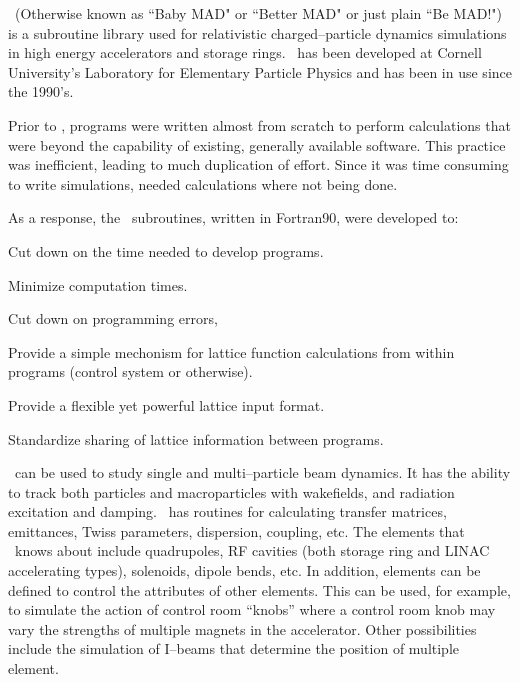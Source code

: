 
\bmad\ (Otherwise known as ``Baby MAD" or ``Better MAD" or just plain
``Be MAD!")  is a subroutine library used for relativistic
charged--particle dynamics simulations in high energy accelerators and
storage rings. \bmad\ has been developed at Cornell University's
Laboratory for Elementary Particle Physics and has been in use since
the 1990's. 

Prior to \bmad, programs were written almost from scratch to perform
calculations that were beyond the capability of existing, generally
available software. This practice was inefficient, leading to much
duplication of effort.  Since it was time consuming to write
simulations, needed calculations where not being done.

As a response, the \bmad\ subroutines, written in
Fortran90, were developed to:
\begin{Itemize}
\item Cut down on the time needed to develop programs.
\item Minimize computation times.
\item Cut down on programming errors, 
\item Provide a simple mechonism for lattice function calculations
from within programs (control system or otherwise).
\item Provide a flexible yet powerful lattice input format.
\item Standardize sharing of lattice information between 
programs.
\end{Itemize}

\bmad\ can be used to study single and multi--particle beam dynamics.
It has the ability to track both particles and macroparticles with
wakefields, and radiation excitation and damping. \bmad\ has routines
for calculating transfer matrices, emittances, Twiss parameters,
dispersion, coupling, etc. The elements that \bmad\ knows about
include quadrupoles, RF cavities (both storage ring and LINAC
accelerating types), solenoids, dipole bends, etc. In addition,
elements can be defined to control the attributes of other
elements. This can be used, for example, to simulate the action of
control room ``knobs'' where a control room knob may vary the
strengths of multiple magnets in the accelerator. Other possibilities
include the simulation of I--beams that determine the position of
multiple element.

\vfill
\break
